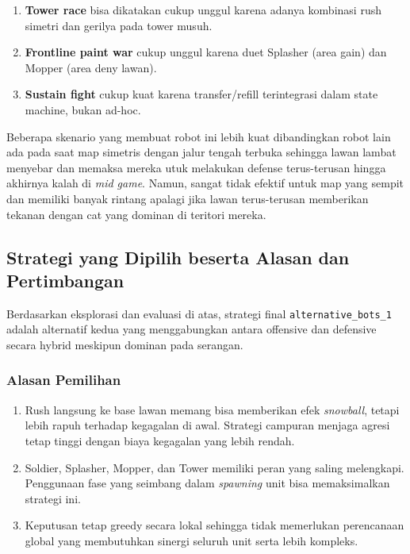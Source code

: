 \begin{enumerate}
    \item \textbf{Tower race} bisa dikatakan cukup unggul karena adanya kombinasi rush simetri dan gerilya pada tower musuh.
    \item \textbf{Frontline paint war} cukup unggul karena duet Splasher (area gain) dan Mopper (area deny lawan).
    \item \textbf{Sustain fight} cukup kuat karena transfer/refill terintegrasi dalam state machine, bukan ad-hoc.
\end{enumerate}

Beberapa skenario yang membuat robot ini lebih kuat dibandingkan robot lain ada pada saat map simetris dengan jalur tengah terbuka sehingga lawan lambat menyebar dan memaksa mereka utuk melakukan defense terus-terusan hingga akhirnya kalah di \textit{mid game}. Namun, sangat tidak efektif untuk map yang sempit dan memiliki banyak rintang apalagi jika lawan terus-terusan memberikan tekanan dengan cat yang dominan di teritori mereka.

\subsection{Strategi yang Dipilih beserta Alasan dan Pertimbangan}

Berdasarkan eksplorasi dan evaluasi di atas, strategi final \texttt{alternative\_bots\_1} adalah alternatif kedua yang menggabungkan antara offensive dan defensive secara hybrid meskipun dominan pada serangan.

\subsubsection{Alasan Pemilihan}

\begin{enumerate}
    \item Rush langsung ke base lawan memang bisa memberikan efek \textit{snowball}, tetapi lebih rapuh terhadap kegagalan di awal. Strategi campuran menjaga agresi tetap tinggi dengan biaya kegagalan yang lebih rendah.

    \item Soldier, Splasher, Mopper, dan Tower memiliki peran yang saling melengkapi. Penggunaan fase yang seimbang dalam \textit{spawning} unit bisa memaksimalkan strategi ini.

    \item Keputusan tetap greedy secara lokal sehingga tidak memerlukan perencanaan global yang membutuhkan sinergi seluruh unit serta lebih kompleks.
\end{enumerate}

